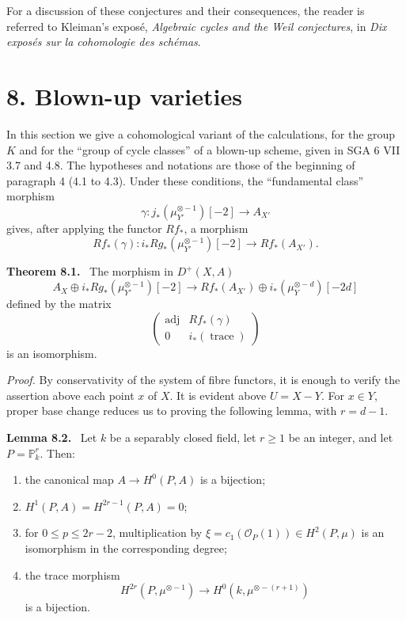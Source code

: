 \documentclass[11pt]{article}
\newenvironment{statement}[1]{\par\medskip\noindent\textbf{#1.}\ }{\par\medskip}
\begin{document}
For a discussion of these conjectures and their consequences, the reader is referred to Kleiman's exposé, \emph{Algebraic cycles and the Weil conjectures}, in \emph{Dix exposés sur la cohomologie des schémas}.

\section*{8. Blown-up varieties}

In this section we give a cohomological variant of the calculations, for the group $K$ and for the ``group of cycle classes'' of a blown-up scheme, given in SGA 6 VII 3.7 and 4.8. The hypotheses and notations are those of the beginning of paragraph 4 (4.1 to 4.3). Under these conditions, the ``fundamental class'' morphism
\[
\gamma:j_*(\mu_{Y'}^{\otimes -1})[-2]\to A_{X'}
\]
gives, after applying the functor $Rf_*$, a morphism
\[
Rf_*(\gamma):i_*Rg_*(\mu_{Y'}^{\otimes -1})[-2]\to Rf_*(A_{X'}).
\]

\begin{statement}{Theorem 8.1}
The morphism in $D^+(X,A)$
\[
A_X\oplus i_*Rg_*(\mu_{Y'}^{\otimes -1})[-2]\to
Rf_*(A_{X'})\oplus i_*(\mu_Y^{\otimes -d})[-2d]
\tag{8.1.1}
\]
defined by the matrix
\[
\begin{pmatrix}
\operatorname{adj}&Rf_*(\gamma)\\
0&i_*(\operatorname{trace})
\end{pmatrix}
\]
is an isomorphism.
\end{statement}

\emph{Proof.} By conservativity of the system of fibre functors, it is enough to verify the assertion above each point $x$ of $X$. It is evident above $U=X-Y$. For $x\in Y$, proper base change reduces us to proving the following lemma, with $r=d-1$.

\begin{statement}{Lemma 8.2}
Let $k$ be a separably closed field, let $r\ge1$ be an integer, and let $P=\mathbb P_k^r$. Then:
\begin{enumerate}[label=\alph*)]
\item the canonical map $A\to H^0(P,A)$ is a bijection;
\item $H^1(P,A)=H^{2r-1}(P,A)=0$;
\item for $0\le p\le2r-2$, multiplication by $\xi=c_1(\mathcal O_P(1))\in H^2(P,\mu)$ is an isomorphism in the corresponding degree;
\item the trace morphism
\[
H^{2r}(P,\mu^{\otimes -1})\to H^0(k,\mu^{\otimes -(r+1)})
\]
is a bijection.
\end{enumerate}
\end{statement}
\end{document}
